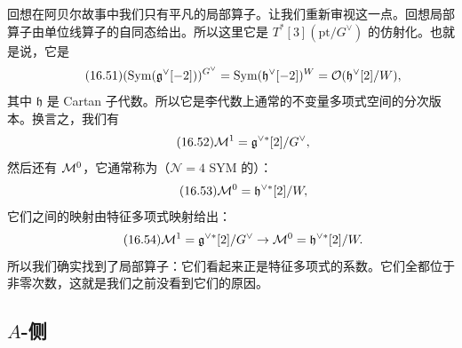 回想在阿贝尔故事中我们只有平凡的局部算子。让我们重新审视这一点。回想局部算子由单位线算子的自同态给出。所以这里它是 $T^*[3](\mathrm{pt}/G^\vee)$ 的仿射化。也就是说，它是
\begin{equation}\tag{16.51}
(\mathrm{Sym}(\mathfrak{g}^\vee[-2]))^{G^\vee}=\mathrm{Sym}(\mathfrak{h}^\vee[-2])^W=\mathcal{O}(\mathfrak{h}^\vee[2]/W),
\end{equation}
其中 $\mathfrak{h}$ 是 Cartan 子代数。所以它是李代数上通常的不变量多项式空间的分次版本。换言之，我们有
\begin{equation}\tag{16.52}
\mathcal{M}^1=\mathfrak{g}^{\vee*}[2]/G^\vee,
\end{equation}
然后还有 $\mathcal{M}^0$，它通常称为（$\mathcal{N}=4$ SYM 的）：
\begin{equation}\tag{16.53}
\mathcal{M}^0=\mathfrak{h}^{\vee*}[2]/W,
\end{equation}
它们之间的映射由特征多项式映射给出：
\begin{equation}\tag{16.54}
\mathcal{M}^1=\mathfrak{g}^{\vee*}[2]/G^\vee\to\mathcal{M}^0=\mathfrak{h}^{\vee*}[2]/W.
\end{equation}
所以我们确实找到了局部算子：它们看起来正是特征多项式的系数。它们全都位于非零次数，这就是我们之前没看到它们的原因。%

\subsection{$A$-侧}

